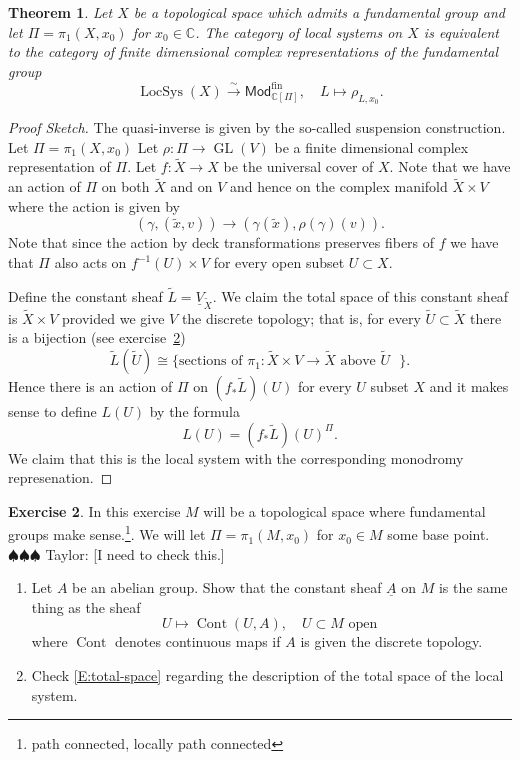 \documentclass[12pt]{book}
\newcommand{\taylor}[1]{{\color{blue} \sf $\spadesuit\spadesuit\spadesuit$ Taylor: [#1]}}
\numberwithin{equation}{section}
\newtheorem{theorem}{Theorem}[subsection]
\theoremstyle{definition}
\newtheorem{exercise}[theorem]{Exercise}
\theoremstyle{remark}
\newcommand{\CC}{\mathbb{C}}
\newcommand{\GL}{\operatorname{GL}}
\newcommand{\LocSys}{\operatorname{LocSys}}
\newcommand{\Mod}{\mathsf{Mod}}
\newcommand{\fin}{\operatorname{fin}}
\newcommand{\Cont}{\operatorname{Cont}}
\begin{document}
\begin{theorem}
	Let $X$ be a topological space which admits a fundamental group and let $\Pi = \pi_1(X,x_0)$ for $x_0\in \CC$. 
	The category of local systems on $X$ is equivalent to the category of finite dimensional complex representations of the fundamental group 
	$$ \LocSys(X) \xrightarrow{\sim} \Mod_{\CC[\Pi]}^{\fin}, \quad L \mapsto \rho_{L,x_0}.$$
\end{theorem}
\begin{proof}[Proof Sketch]
	The quasi-inverse is given by the so-called suspension construction. 
	Let $\Pi = \pi_1(X,x_0)$
	Let $\rho: \Pi \to \GL(V)$ be a finite dimensional complex representation of $\Pi$.
	Let $f: \widetilde{X} \to X$ be the universal cover of $X$. 
	Note that we have an action of $\Pi$ on both $\widetilde{X}$ and on $V$ and hence on the complex manifold $\widetilde{X}\times V$ where the action is given by 
	$$(\gamma, (\widetilde{x},v))\to (\gamma(\widetilde{x}), \rho(\gamma)(v)).$$
	Note that since the action by deck transformations preserves fibers of $f$ we have that $\Pi$ also acts on $f^{-1}(U) \times V$ for every open subset $U \subset X$. 
	
	Define the constant sheaf $ \widetilde{L} = \underline{V}_{\widetilde{X}}.$
	We claim the total space of this constant sheaf is $\widetilde{X}\times V$ provided we give $V$ the discrete topology; that is, for every $\widetilde{U} \subset \widetilde{X}$ there is a bijection (see exercise~\ref{EX:total-space})
	\begin{equation}\label{E:total-space}
	\widetilde{L}(\widetilde{U})  \cong \lbrace \mbox{sections of $\pi_1: \widetilde{X}\times V \to \widetilde{X}$ above $\widetilde{U}$ } \rbrace.
	\end{equation}
	Hence there is an action of  $\Pi$ on $(f_*\widetilde{L})(U)$ for every $U$ subset $X$ and it makes sense to define $L(U)$ by the formula 
	$$ L(U) = (f_*\widetilde{L})(U)^{\Pi}. $$
	We claim that this is the local system with the corresponding monodromy represenation.
\end{proof}

\begin{exercise}\label{EX:total-space}
	In this exercise $M$ will be a topological space where fundamental groups make sense.\footnote{path connected, locally path connected}. 
	We will let $\Pi = \pi_1(M,x_0)$ for $x_0\in M$ some base point.  	\taylor{I need to check this.}
	\begin{enumerate}
		\item Let $A$ be an abelian group.
		Show that the constant sheaf $\underline{A}$ on $M$ is the same thing as the sheaf  $$U\mapsto\Cont(U,A), \quad U \subset M \mbox{ open }$$ 
		where $\Cont$ denotes continuous maps if $A$ is given the discrete topology. 
		\item Check \eqref{E:total-space} regarding the description of the total space of the local system.
	\end{enumerate}
\end{exercise}
\end{document}

